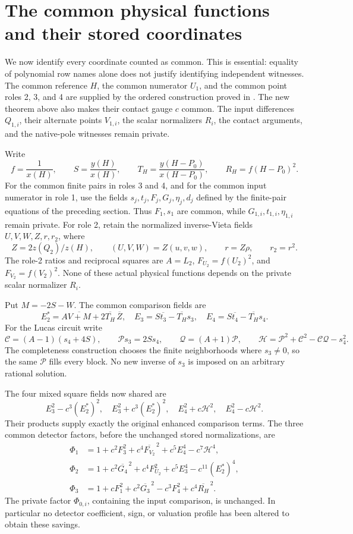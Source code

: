 \documentclass[11pt]{article}
\begin{document}
\section{The common physical functions and their stored coordinates}
\label{sec:global-dictionary}

We now identify every coordinate counted as common. This is essential:
equality of polynomial row names alone does not justify identifying
independent witnesses. The common reference \(H\), the common numerator
\(U_1\), and the common point roles 2, 3, and 4 are supplied by the
ordered construction proved in \cite{common,crt}. The new theorem above
also makes their contact gauge \(c\) common. The input differences
\(Q_{1,i}\), their alternate points \(V_{1,i}\), the scalar normalizers
\(R_i\), the contact arguments, and the native-pole witnesses remain
private.

Write
\[
 f=\frac1{x(H)},\qquad S=\frac{y(H)}{x(H)},\qquad
 T_H=\frac{y(H-P_0)}{x(H-P_0)},\qquad R_H=f(H-P_0)^2.
\]
For the common finite pairs in roles 3 and 4, and for the common input
numerator in role 1, use the fields \(s_j,t_j,F_j,G_j,\eta_j,d_j\)
defined by the finite-pair equations of the preceding section.
Thus \(F_1,s_1\) are common, while \(G_{1,i},t_{1,i},\eta_{1,i}\)
remain private. For role 2, retain the normalized inverse-Vieta fields
\(U,V,W,Z,r,r_2\), where
\[
 Z=2z(Q_2)/z(H),\qquad
 (U,V,W)=Z(u,v,w),\qquad r=Z\rho,\qquad r_2=r^2.
\]
The role-2 ratios and reciprocal squares are
\(A=L_2\), \(F_{U_2}=f(U_2)^2\), and
\(F_{V_2}=f(V_2)^2\). None of these actual physical functions depends
on the private scalar normalizer \(R_i\).

Put \(M=-2S-W\). The common comparison fields are
\[
 E_2^*=A\overline{V+M}+2\overline{T_H}\,\overline Z,
 \quad E_3=S\overline{t_3}-\overline{T_H}s_3,
 \quad E_4=S\overline{t_4}-\overline{T_H}s_4.
\]
For the Lucas circuit write
\[
 \mathcal C=(A-1)(s_4+4S),\qquad
 \mathcal P s_3=2Ss_4,\qquad
 \mathcal Q=(A+1)\mathcal P,
 \qquad
 \mathcal H=\mathcal P^2+\mathcal C^2-\mathcal C\mathcal Q-s_4^2.
\]
The completeness construction chooses the finite neighborhoods where
\(s_3\ne0\), so the same \(\mathcal P\) fills every block. No new
inverse of \(s_3\) is imposed on an arbitrary rational solution.

The four mixed square fields now shared are
\[
 E_3^2-c^3(E_2^*)^2,\quad E_3^2+c^3(E_2^*)^2,
 \quad E_4^2+c\mathcal H^2,\quad E_4^2-c\mathcal H^2.
\]
Their products supply exactly the original enhanced comparison terms.
The three common detector factors, before the unchanged stored
normalizations, are
\begin{align*}
 \Phi_1&=1+c^2F_3^2+c^4\overline{F_{V_2}}^{\,2}
                +c^5E_4^4-c^7\mathcal H^4,\\
 \Phi_2&=1+c^2\overline{G_4}^{\,2}+c^4F_{U_2}^2
                +c^5E_3^4-c^{11}(E_2^*)^4,\\
 \Phi_3&=1+cF_1^2+c^2\overline{G_3}^{\,2}
                -c^3F_4^2+c^4\overline{R_H}^{\,2}.
\end{align*}
The private factor \(\Phi_{0,i}\), containing the input comparison,
is unchanged. In particular no detector coefficient, sign, or
valuation profile has been altered to obtain these savings.
\end{document}
